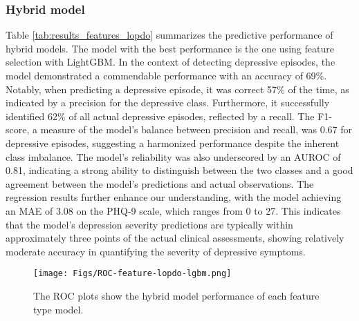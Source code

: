 \subsubsection{Hybrid model}
Table \ref{tab:results_features_lopdo} summarizes the predictive performance of hybrid models. The model with the best performance is the one using feature selection with LightGBM. In the context of detecting depressive episodes, the model demonstrated a commendable performance with an accuracy of 69\%. Notably, when predicting a depressive episode, it was correct 57\% of the time, as indicated by a precision for the depressive class. Furthermore, it successfully identified 62\% of all actual depressive episodes, reflected by a recall. The F1-score, a measure of the model's balance between precision and recall, was 0.67 for depressive episodes, suggesting a harmonized performance despite the inherent class imbalance. The model's reliability was also underscored by an AUROC of 0.81, indicating a strong ability to distinguish between the two classes and a good agreement between the model's predictions and actual observations. The regression results further enhance our understanding, with the model achieving an MAE of 3.08 on the PHQ-9 scale, which ranges from 0 to 27. This indicates that the model's depression severity predictions are typically within approximately three points of the actual clinical assessments, showing relatively moderate accuracy in quantifying the severity of depressive symptoms.

\begin{figure}[h]
    \texttt{[image: Figs/ROC-feature-lopdo-lgbm.png]}
    \caption{The ROC plots show the hybrid model performance of each feature type model.}
    \label{fig:roc_features_lopdo_lgbm}
\end{figure}

